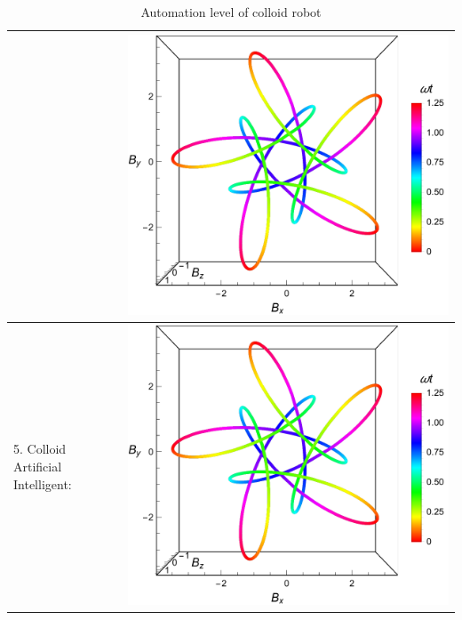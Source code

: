 \begin{table}[h!]
\begin{tabular}{ | m{6cm} | m{6cm} | }
      &
      \begin{minipage}{.15\textwidth}
      \includegraphics[width=\linewidth]{figures/5_1.pdf}
    \end{minipage}
    \\ \hline
      5. Colloid Artificial Intelligent: 
  
      &
      \begin{minipage}{.15\textwidth}
      \includegraphics[width=\linewidth]{figures/5_1.pdf}
    \end{minipage}
    \\ \hline
    
    
    
  \end{tabular}
  \caption{Automation level of colloid robot}\label{tbl:myLboro}
\end{table}



